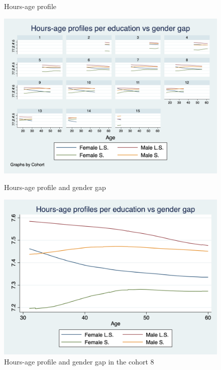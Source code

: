 \documentclass[12pt]{article}
\begin{document}
\begin{center}
\begin{figure}
    \caption{\label{fig:hours}Hours-age profile}
\end{figure}
\begin{figure}
    \includegraphics[scale=0.35]{graph5.png}
    \caption{\label{fig:h_l_cohorts}Hours-age profile and gender gap}
    \includegraphics[scale=0.35]{graph5_1.png}
    \caption{\label{fig:h_l_coh8}Hours-age profile and gender gap in the cohort 8}
\end{figure}
\end{center}

\end{document}
